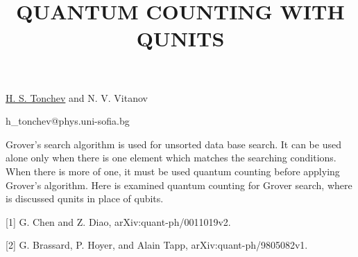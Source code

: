 \title{QUANTUM COUNTING WITH QUNITS}

\underline{H. S. Tonchev} and N. V. Vitanov  

{\normalsize{

\vspace{-4mm}
\unisofia

\email h\_tonchev@phys.uni-sofia.bg}}

Grover's search algorithm is used for unsorted data base search. It can be used alone only when there is one element which matches the searching conditions. When there is more of one, it must be used quantum counting before applying Grover's algorithm. Here is examined quantum counting for Grover search, where is discussed qunits in place of qubits.

{\normalsize
[1] G. Chen and Z. Diao, arXiv:quant-ph/0011019v2.
\vsp

[2] G. Brassard, P. Hoyer, and Alain Tapp, arXiv:quant-ph/9805082v1.
}

\vspace{\baselineskip} 